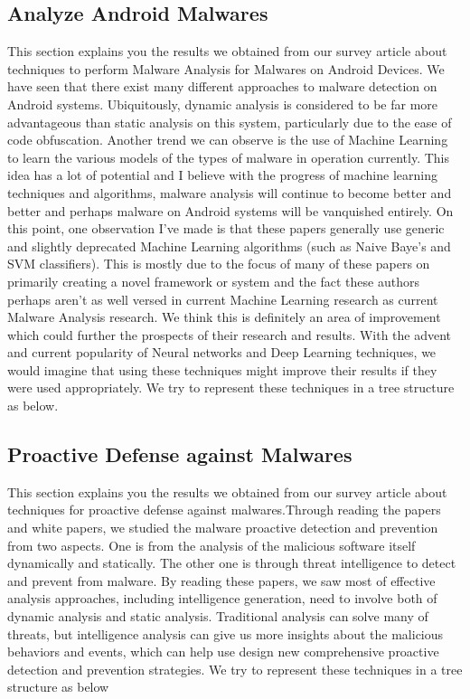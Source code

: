 \documentclass[11pt]{article}
\begin{document}
	
	\subsection{Analyze Android Malwares}
	This section explains you the results we obtained from our survey article about techniques to perform Malware Analysis for Malwares on Android Devices. We have seen that there exist many different approaches to malware detection on Android systems. Ubiquitously, dynamic analysis is considered to be far more advantageous than static analysis on this system, particularly due to the ease of code obfuscation. Another trend we can observe is the use of Machine Learning to learn the various models of the types of malware in operation currently. This idea has a lot of potential and I believe with the progress of machine learning techniques and algorithms, malware analysis will continue to become better and better and perhaps malware on Android systems will be vanquished entirely. On this point, one observation I’ve made is that these papers generally use generic and slightly deprecated Machine Learning algorithms (such as Naive Baye’s and SVM classifiers). This is mostly due to the focus of many of these papers on primarily creating a novel framework or system and the fact these authors perhaps aren’t as well versed in current Machine Learning research as current Malware Analysis research. We think this is definitely an area of improvement which could further the prospects of their research and results. With the advent and current popularity of Neural networks and Deep Learning techniques, we would imagine that using these techniques might improve their results if they were used appropriately. 
	We try to represent these techniques in a tree structure as below.\\
		
	
	\subsection{Proactive Defense against Malwares}
	This section explains you the results we obtained from our survey article about techniques for proactive defense against malwares.Through reading the papers and white papers, we studied the malware proactive detection and prevention from two aspects. One is from the analysis of the malicious software itself dynamically and statically. The other one is through threat intelligence to detect and prevent from malware. By reading these papers, we saw most of effective analysis approaches, including intelligence generation, need to involve both of dynamic analysis and static analysis.  Traditional analysis can solve many of threats, but intelligence analysis can give us more insights about the malicious behaviors and events, which can help use design new comprehensive proactive detection and prevention strategies. We try to represent these techniques in a tree structure as below\\
	
\end{document}
